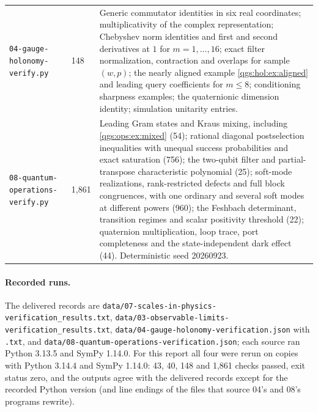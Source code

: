 \documentclass[11pt,oneside]{article}
\numberwithin{equation}{section}
\theoremstyle{plain}
\theoremstyle{definition}
\theoremstyle{remark}
\begin{document}
\begin{longtable}{@{}L{0.30\textwidth}L{0.12\textwidth}L{0.50\textwidth}@{}}
\nolinkurl{04-gauge-holonomy-verify.py} & 148 & Generic commutator identities in six real coordinates; multiplicativity of the complex representation; Chebyshev norm identities and first and second derivatives at $1$ for $m=1,\ldots,16$; exact filter normalization, contraction and overlaps for sample $(w,p)$; the nearly aligned example \cref{qgs:hol:ex:aligned} and leading query coefficients for $m\le8$; conditioning sharpness examples; the quaternionic dimension identity; simulation unitarity entries.\\[3pt]
\nolinkurl{08-quantum-operations-verify.py} & 1,861 & Leading Gram states and Kraus mixing, including \cref{qgs:ops:ex:mixed} (54); rational diagonal postselection inequalities with unequal success probabilities and exact saturation (756); the two-qubit filter and partial-transpose characteristic polynomial (25); soft-mode realizations, rank-restricted defects and full block congruences, with one ordinary and several soft modes at different powers (960); the Feshbach determinant, transition regimes and scalar positivity threshold (22); quaternion multiplication, loop trace, port completeness and the state-independent dark effect (44). Deterministic seed 20260923.\\
\end{longtable}

\paragraph{Recorded runs.} The delivered records are \nolinkurl{data/07-scales-in-physics-verification_results.txt}, \nolinkurl{data/03-observable-limits-verification_results.txt}, \nolinkurl{data/04-gauge-holonomy-verification.json} with \texttt{.txt}, and \nolinkurl{data/08-quantum-operations-verification.json}; each source ran Python 3.13.5 and SymPy 1.14.0. For this report all four were rerun on copies with Python 3.14.4 and SymPy 1.14.0: 43, 40, 148 and 1,861 checks passed, exit status zero, and the outputs agree with the delivered records except for the recorded Python version (and line endings of the files that source 04's and 08's programs rewrite).
\end{document}
